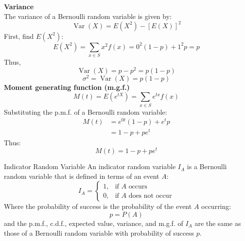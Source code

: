 ﻿\documentclass[12pt]{article}
\begin{document}
\textbf{Variance}\\
The variance of a Bernoulli random variable is given by:
    \[\operatorname{Var}(X) = E(X^2) - [E(X)]^2\]
First, find \(E(X^2)\):
\[
E(X^2)=\sum_{x\in S}x^2f(x)=0^2(1-p)+1^2p=p
\]
Thus,
\[
\operatorname{Var}(X)=p-p^2 =p(1-p)
\]
\[\boxed{\sigma^2 = \operatorname{Var}(X)=p(1-p)}\]
\newpage
\textbf{Moment generating function (m.g.f.)}
\[
M(t)=E(e^{tX})=\sum_{x\in S}e^{tx}f(x)
\]
Substituting the p.m.f. of a Bernoulli random variable:
\[
\begin{aligned}
M(t)&=e^{0t}(1-p)+e^tp\\
&=1-p+pe^t
\end{aligned}
\]
Thus:
\[
\boxed{M(t)=1-p+pe^t}
\]
\begin{definition}{Indicator Random Variable}
    An indicator random variable $I_A$ is a Bernoulli random variable that is defined in terms of an event $A$:
    \[I_A = \begin{cases}
    1, & \text{if } A \text{ occurs}\\
    0, & \text{if } A \text{ does not occur}
    \end{cases}\]
    Where the probability of success is the probability of the event $A$ occurring:
    \[p = P(A)\]
    and the p.m.f., c.d.f., expected value, variance, and m.g.f. of $I_A$ are the same as those of a Bernoulli random variable with probability of success $p$.
\end{definition}
\end{document}
